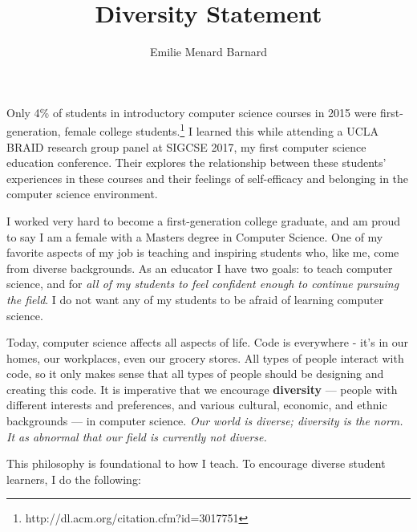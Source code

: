 \documentclass[12pt]{amsart} \usepackage{amssymb}
\title[]{Diversity Statement}
\author[]{Emilie Menard Barnard}
\begin{document}
\maketitle
\thispagestyle{empty}


%
%
%


Only 4\% of students in introductory computer science courses in 2015 were first-generation, female college students.\footnote{http://dl.acm.org/citation.cfm?id=3017751} I learned this while attending a UCLA BRAID research group panel at SIGCSE 2017, my first computer science education conference. Their explores the relationship between these students' experiences in these courses and their feelings of self-efficacy and belonging in the computer science environment. 

I worked very hard to become a first-generation college graduate, and am proud to say I am a female with a Masters degree in Computer Science. One of my favorite aspects of my job is teaching and inspiring students who, like me, come from diverse backgrounds. As an educator I have two goals: to teach computer science, and for \emph{all of my students to feel confident enough to continue pursuing the field}. I do not want any of my students to be afraid of learning computer science.

Today, computer science affects all aspects of life. Code is everywhere - it's in our homes, our workplaces, even our grocery stores. All types of people interact with code, so it only makes sense that all types of people should be designing and creating this code. It is imperative that we encourage \textbf{diversity} --- people with different interests and preferences, and various cultural, economic, and ethnic backgrounds --- in computer science. \emph{Our world is diverse; diversity is the norm. It as abnormal that our field is currently not diverse.}

This philosophy is foundational to how I teach. To encourage diverse student learners, I do the following:
\end{document}

